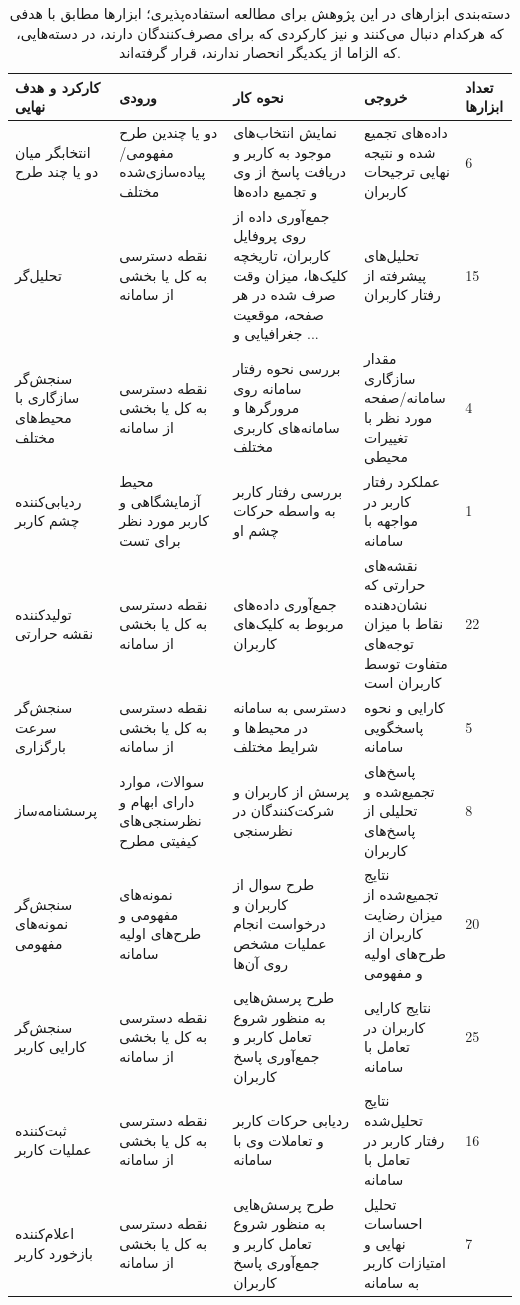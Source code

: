	\begin{table}[H]
		\caption[دسته‌بندی ابزارهای مطرح در این پژوهش برای مطالعه استفاده‌پذیری]{
			دسته‌بندی ابزارهای در این پژوهش برای مطالعه استفاده‌پذیری؛ ابزارها مطابق با هدفی که هرکدام دنبال می‌کنند و نیز کارکردی که برای مصرف‌کنندگان دارند، در دسته‌هایی، که الزاما از یکدیگر انحصار ندارند، قرار گرفته‌اند.
		}
	\label{tab:tools_category}
		\centering
		\begin{tabular}{|C{3cm}|C{3.2cm}|C{3.2cm}|C{3.2cm}|C{0.8cm}|}
			\hline
			کارکرد و هدف نهایی & ورودی & نحوه کار & خروجی & تعداد ابزارها \\ \hline
			انتخابگر میان دو یا چند طرح & دو یا چندین طرح مفهومی/پیاده‌سازی‌شده مختلف & نمایش انتخاب‌های موجود به کاربر و دریافت پاسخ از وی و تجمیع داده‌ها & داده‌های تجمیع شده و نتیجه نهایی ترجیحات کاربران & 6 \\ \hline
			تحلیل‌گر & نقطه دسترسی به کل یا بخشی از سامانه & جمع‌آوری داده از روی پروفایل کاربران، تاریخچه کلیک‌ها، میزان وقت صرف شده در هر صفحه، موقعیت جغرافیایی و ... & تحلیل‌های پیشرفته از رفتار کاربران & 15 \\ \hline
			سنجش‌گر سازگاری با محیط‌های مختلف & نقطه دسترسی به کل یا بخشی از سامانه & بررسی نحوه رفتار سامانه  روی مرورگرها و سامانه‌های کاربری مختلف & مقدار سازگاری سامانه/صفحه مورد نظر با تغییرات محیطی & 4 \\ \hline
			ردیابی‌کننده  چشم کاربر & محیط آزمایشگاهی و کاربر مورد نظر برای تست & بررسی رفتار کاربر به واسطه حرکات چشم او & عملکرد رفتار کاربر در مواجهه با سامانه & 1 \\ \hline
			تولیدکننده نقشه حرارتی & نقطه دسترسی به کل یا بخشی از سامانه & جمع‌‌آوری داده‌های مربوط به کلیک‌های کاربران & نقشه‌های حرارتی که نشان‌دهنده نقاط با میزان توجه‌های متفاوت توسط کاربران است & 22 \\ \hline
			سنجش‌‌گر سرعت بارگزاری & نقطه دسترسی به کل یا بخشی از سامانه & دسترسی به سامانه در محیط‌ها و شرایط مختلف & کارایی و نحوه پاسخگویی سامانه & 5 \\ \hline
			پرسشنامه‌ساز & سوالات، موارد دارای ابهام و نظرسنجی‌های کیفیتی مطرح & پرسش از کاربران و شرکت‌کنندگان در نظرسنجی & پاسخ‌های تجمیع‌شده و تحلیلی از پاسخ‌های کاربران & 8 \\ \hline
			سنجش‌گر نمونه‌های مفهومی & نمونه‌های مفهومی و طرح‌های اولیه سامانه & طرح سوال از کاربران و درخواست انجام عملیات مشخص روی آن‌ها & نتایج تجمیع‌شده از میزان رضایت کاربران از طرح‌های اولیه و مفهومی & 20 \\ \hline
			سنجش‌گر کارایی کاربر & نقطه دسترسی به کل یا بخشی از سامانه & طرح پرسش‌هایی به منظور شروع تعامل کاربر و جمع‌آوری پاسخ کاربران & نتایج کارایی کاربران در تعامل با سامانه & 25 \\ \hline
			ثبت‌کننده عملیات کاربر & نقطه دسترسی به کل یا بخشی از سامانه & ردیابی حرکات کاربر و تعاملات وی با سامانه & نتایج تحلیل‌شده رفتار کاربر در تعامل با سامانه & 16 \\ \hline
			اعلام‌کننده بازخورد کاربر & نقطه دسترسی به کل یا بخشی از سامانه & طرح پرسش‌هایی به منظور شروع تعامل کاربر و جمع‌آوری پاسخ کاربران & تحلیل احساسات نهایی و امتیازات کاربر به سامانه & 7 \\ \hline
		\end{tabular}
	\end{table}
